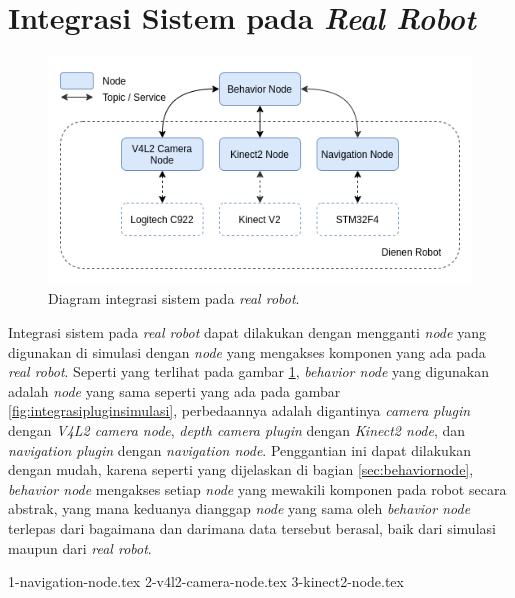 \section{Integrasi Sistem pada \emph{Real Robot}}
\label{sec:integrasirobot}

\begin{figure}[ht]
  \centering
  \includegraphics[scale=0.55]{gambar/integrasi-real-robot.png}
  \caption{Diagram integrasi sistem pada \emph{real robot}.}
  \label{fig:integrasirealrobot}
\end{figure}

Integrasi sistem pada \emph{real robot} dapat dilakukan dengan mengganti \emph{node} yang digunakan di simulasi dengan \emph{node} yang mengakses komponen yang ada pada \emph{real robot}.
Seperti yang terlihat pada gambar \ref{fig:integrasirealrobot},
  \emph{behavior node} yang digunakan adalah \emph{node} yang sama seperti yang ada pada gambar \ref{fig:integrasipluginsimulasi},
  perbedaannya adalah digantinya \emph{camera plugin} dengan \emph{V4L2 camera node},
  \emph{depth camera plugin} dengan \emph{Kinect2 node},
  dan \emph{navigation plugin} dengan \emph{navigation node}.
Penggantian ini dapat dilakukan dengan mudah,
  karena seperti yang dijelaskan di bagian \ref{sec:behaviornode},
  \emph{behavior node} mengakses setiap \emph{node} yang mewakili komponen pada robot secara abstrak,
  yang mana keduanya dianggap \emph{node} yang sama oleh \emph{behavior node} terlepas dari bagaimana dan darimana data tersebut berasal,
  baik dari simulasi maupun dari \emph{real robot}.

{1-navigation-node.tex}
{2-v4l2-camera-node.tex}
{3-kinect2-node.tex}
